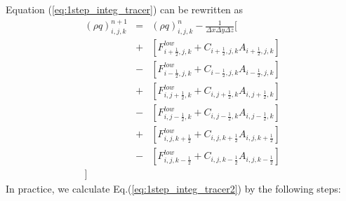Equation (\ref{eq:1step_integ_tracer}) can be rewritten as
\begin{eqnarray}
\left(\rho q\right)^{n+1}_{i,j,k} 
&=& \left(\rho q\right)^{n}_{i,j,k}
- \frac{1}{\Delta x \Delta y \Delta z}
\big[ \nonumber\\
&+&
\left[ F_{i+\frac{1}{2},j,k}^{low}
+ C_{i+\frac{1}{2},j,k}  A_{i+\frac{1}{2},j,k}\right]\nonumber\\
&-&
\left[ F_{i-\frac{1}{2},j,k}^{low}
+ C_{i-\frac{1}{2},j,k}  A_{i-\frac{1}{2},j,k}\right]\nonumber\\
&+&
\left[ F_{i,j+\frac{1}{2},k}^{low}
+ C_{i,j+\frac{1}{2},k}  A_{i,j+\frac{1}{2},k}\right]\nonumber\\
&-&
\left[ F_{i,j-\frac{1}{2},k}^{low}
+ C_{i,j-\frac{1}{2},k}  A_{i,j-\frac{1}{2},k}\right]\nonumber\\
&+&
\left[ F_{i,j,k+\frac{1}{2}}^{low}
+ C_{i,j,k+\frac{1}{2}}  A_{i,j,k+\frac{1}{2}}\right]\nonumber\\
&-&
\left[ F_{i,j,k-\frac{1}{2}}^{low}
+ C_{i,j,k-\frac{1}{2}}  A_{i,j,k-\frac{1}{2}}\right]\nonumber\\
\big]
\label{eq:1step_integ_tracer2}
\end{eqnarray}
In practice, we calculate Eq.(\ref{eq:1step_integ_tracer2}) by the 
following steps:
